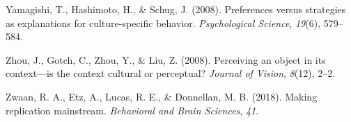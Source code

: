 \documentclass[
  man,floatsintext]{apa6}
\newlength{\cslhangindent}
\newlength{\cslentryspacingunit} %
\newenvironment{CSLReferences}[2] %
 {%
  \setlength{\parindent}{0pt}
  \ifodd #1
  \let\oldpar\par
  \def\par{\hangindent=\cslhangindent\oldpar}
  \fi
  \setlength{\parskip}{#2\cslentryspacingunit}
 }%
 {}
\begin{document}
\begin{CSLReferences}{1}{0}
\leavevmode{}%
Yamagishi, T., Hashimoto, H., \& Schug, J. (2008). Preferences versus strategies as explanations for culture-specific behavior. \emph{Psychological Science}, \emph{19}(6), 579--584.

\leavevmode{}%
Zhou, J., Gotch, C., Zhou, Y., \& Liu, Z. (2008). Perceiving an object in its context---is the context cultural or perceptual? \emph{Journal of Vision}, \emph{8}(12), 2--2.

\leavevmode{}%
Zwaan, R. A., Etz, A., Lucas, R. E., \& Donnellan, M. B. (2018). Making replication mainstream. \emph{Behavioral and Brain Sciences}, \emph{41}.

\end{CSLReferences}
\end{document}
